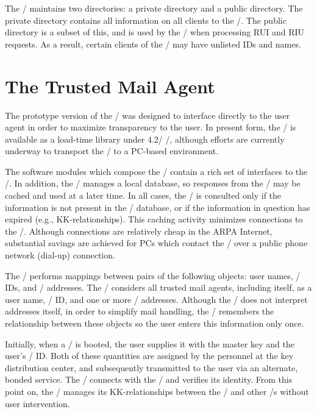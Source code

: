 The \KDS/ maintains two directories:
a private directory and a public directory.
The private directory contains all information on all clients to the \KDS/.
The public directory is a subset of this,
and is used by the \KDS/ when processing RUI and RIU requests.%
As a result,
certain clients of the \KDS/ may have unlisted IDs and names.

\section{The Trusted Mail Agent}
The prototype version of the \TMA/
was designed to interface directly to the user agent in order to maximize
transparency to the user.
In present form,
the \TMA/ is available as a load-time library under 4.2\bsd/ \unix/,
although efforts are currently underway to transport the \TMA/ to a PC-based
environment.

The software modules which compose the \TMA/ contain a rich set of interfaces
to the \KDS/.
In addition,
the \TMA/ manages a local database,
so responses from the \KDS/ may be cached and used at a later time.
In all cases,
the \KDS/ is consulted only if the information is not present
in the \TMA/ database,
or if the information in question has expired (e.g., KK-relationships).
This caching activity minimizes connections to the \KDS/.
Although connections are relatively cheap in the ARPA Internet,
substantial savings are achieved for PCs which contact the \KDS/ over a
public phone network (dial-up) connection.

The \TMA/ performs mappings between pairs of the following objects:
user names, \KDS/ IDs, and \MTS/ addresses.
The \TMA/ considers all trusted mail agents, including itself,
as a user name, \KDS/ ID, and one or more \MTS/ addresses.
Although the \TMA/ does not interpret addresses itself,
in order to simplify mail handling,
the \TMA/ remembers the relationship between these objects so the user enters
this information only once.

Initially,
when a \TMA/ is booted,
the user supplies it with the master key and the user's \KDS/ ID.
Both of these quantities are assigned by the personnel at the key
distribution center,
and subsequently transmitted to the user via an alternate, bonded service.%
The \TMA/ connects with the \KDS/ and verifies its identity.
From this point on,
the \TMA/ manages its KK-relationships between the \KDS/ and other \TMA/s
without user intervention.

